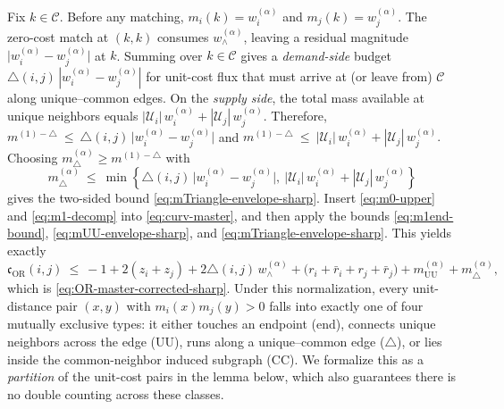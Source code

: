 \documentclass[twoside,11pt]{article}
\numberwithin{equation}{section}
\numberwithin{theorem}{section}
\numberwithin{example}{section}
\begin{document}
\noindent 
Fix $k\in\mathcal C$. Before any matching, $m_i(k)=w^{(\alpha)}_i$ and $m_j(k)=w^{(\alpha)}_j$. The zero-cost match at $(k,k)$ consumes $w^{(\alpha)}_\wedge$, leaving a residual magnitude
\(
\bigl|w^{(\alpha)}_i-w^{(\alpha)}_j\bigr|
\)
at $k$. Summing over $k\in\mathcal C$ gives a \emph{demand-side} budget $\triangle(i,j)\,|w^{(\alpha)}_i-w^{(\alpha)}_j|$ for unit-cost flux that must arrive at (or leave from) $\mathcal C$ along unique--common edges. On the \emph{supply side}, the total mass available at unique neighbors equals $|\mathcal U_i|\,w^{(\alpha)}_i+|\mathcal U_j|\,w^{(\alpha)}_j$. Therefore,
\(
m^{(1)-\triangle}\ \le\ \triangle(i,j)\,\bigl|w^{(\alpha)}_i-w^{(\alpha)}_j\bigr|
\) and \(
m^{(1)-\triangle}\ \le\ |\mathcal U_i|\,w^{(\alpha)}_i+|\mathcal U_j|\,w^{(\alpha)}_j.
\)
Choosing $m^{(\alpha)}_{\triangle}\ge m^{(1)-\triangle}$ with
\[
m^{(\alpha)}_{\triangle}\ \le\ \min\!\left\{
\triangle(i,j)\,\bigl|w^{(\alpha)}_i-w^{(\alpha)}_j\bigr|,\ 
|\mathcal U_i|\,w^{(\alpha)}_i+|\mathcal U_j|\,w^{(\alpha)}_j
\right\}
\]
gives the two-sided bound \eqref{eq:mTriangle-envelope-sharp}.
Insert \eqref{eq:m0-upper} and \eqref{eq:m1-decomp} into \eqref{eq:curv-master}, and then apply the bounds \eqref{eq:m1end-bound}, \eqref{eq:mUU-envelope-sharp}, and \eqref{eq:mTriangle-envelope-sharp}. This yields exactly
\[
\mathfrak c_{\mathrm{OR}}(i,j)
\ \le\
-1+2(z_i+z_j)+2\triangle(i,j)\,w^{(\alpha)}_\wedge
+\bigl(r_i+\bar r_i+r_j+\bar r_j\bigr)
+m^{(\alpha)}_{\mathrm{UU}}
+m^{(\alpha)}_{\triangle},
\]
which is \eqref{eq:OR-master-corrected-sharp}. Under this normalization, every unit-distance pair $(x,y)$ with $m_i(x)m_j(y)>0$ falls into exactly one of four mutually exclusive types: it either touches an endpoint ($\mathrm{end}$), connects unique neighbors across the edge ($\mathrm{UU}$), runs along a unique--common edge ($\triangle$), or lies inside the common-neighbor induced subgraph ($\mathrm{CC}$).  We formalize this as a \emph{partition} of the unit-cost pairs in the lemma below, which also guarantees there is no double counting across these classes.
\end{document}
